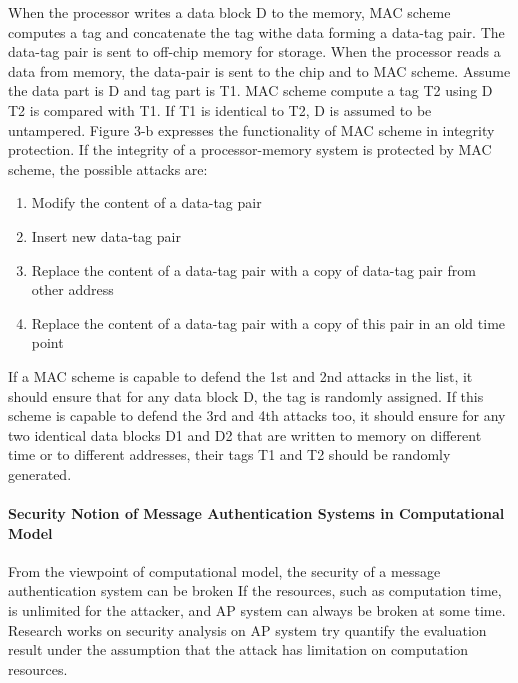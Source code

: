 \documentclass{article}
\begin{document}
When the processor writes a data block D to the memory, MAC scheme computes a tag  and concatenate the tag withe data forming a data-tag pair. The data-tag pair is sent to off-chip memory for storage.
When the processor reads a data from memory, the data-pair is sent to the chip and to MAC scheme. Assume the data part is D and tag part is T1. MAC scheme compute a tag T2 using D T2 is compared with T1. If T1 is identical to T2, D is assumed to be untampered.
 Figure 3-b expresses the functionality of MAC scheme in integrity protection.
If the integrity of a processor-memory system is protected by MAC scheme, the possible attacks are:
\begin{enumerate}
	\item Modify the content of a data-tag pair
	\item Insert new data-tag pair
	\item Replace the content of a data-tag pair with a copy of data-tag pair from other address
	\item Replace the content of a data-tag pair with a copy of this pair in an old time point
\end{enumerate}
If a MAC scheme is capable to defend the 1st and 2nd attacks in the list, it should ensure that for any data block D, the tag is randomly assigned. If this scheme is capable to defend the 3rd and 4th attacks too, it should ensure for any two identical data blocks D1 and D2 that are written to memory on different time or to different addresses, their tags T1 and T2 should be randomly generated.

\paragraph{Security Notion of Message Authentication Systems in Computational Model}
From the viewpoint of computational model, the security of a message authentication system can be broken If the resources, such as computation time, is unlimited for the attacker, and AP system can always be broken at some time. Research works on security analysis on AP system try quantify the evaluation result under the assumption that the attack has limitation on computation resources.

  
\end{document}
